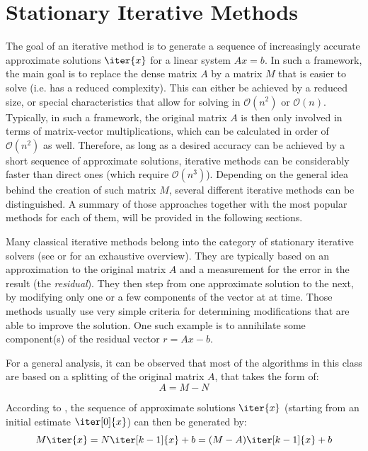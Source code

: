 \section{Stationary Iterative Methods}
\label{sec:stationary_methods}

The goal of an iterative method is to generate a sequence of increasingly accurate approximate solutions $\iter{x}$ for a linear system $Ax=b$. In such a framework, the main goal is to replace the dense matrix $A$ by a matrix $M$ that is easier to solve (i.e. has a reduced complexity). This can either be achieved by a reduced size, or special characteristics that allow for solving in $\mathcal{O}(n^2)$ or $\mathcal{O}(n)$. Typically, in such a framework, the original matrix $A$ is then only involved in terms of matrix-vector multiplications, which can be calculated in order of $\mathcal{O}(n^2)$ as well. Therefore, as long as a desired accuracy can be achieved by a short sequence of approximate solutions, iterative methods can be considerably faster than direct ones (which require $\mathcal{O}(n^3)$). Depending on the general idea behind the creation of such matrix $M$, several different iterative methods can be distinguished. A summary of those approaches together with the most popular methods for each of them, will be provided in the following sections.

Many classical iterative methods belong into the category of stationary iterative solvers (see \cite{saad_iterative_2003} or \cite{golub_matrix_2013} for an exhaustive overview). They are typically based on an approximation to the original matrix $A$ and a measurement for the error in the result (the \textit{residual}). They then step from one approximate solution to the next, by modifying only one or a few components of the vector at at time. Those methods usually use very simple criteria for determining modifications that are able to improve the solution. One such example is to annihilate some component(s) of the residual vector $r=Ax -b$. 

For a general analysis, it can be observed that most of the algorithms in this class are based on a splitting of the original matrix $A$, that takes the form of:
\begin{equation}
\label{eqn:splitting}
    A = M - N
\end{equation}

\noindent According to \cite{golub_matrix_2013}, the sequence of approximate solutions $\iter{x}$ (starting from an initial estimate $\iter[0]{x}$) can then be generated by:
\begin{equation}
    M\iter{x} = N\iter[k-1]{x} +b = (M-A)\iter[k-1]{x}+b
\end{equation}

